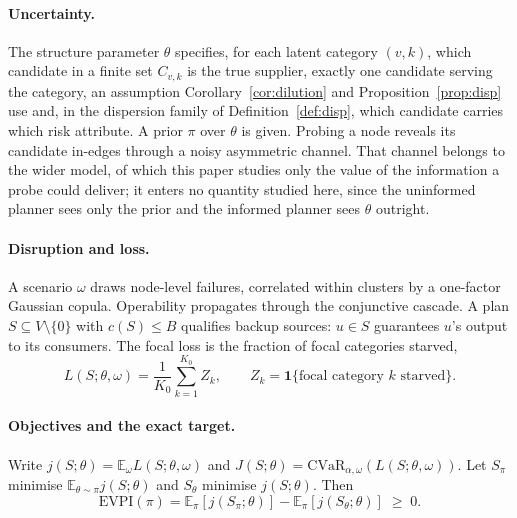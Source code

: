 \documentclass[pdflatex,sn-mathphys-num]{sn-jnl}
\theoremstyle{thmstyleone}
\theoremstyle{thmstyletwo}
\theoremstyle{thmstylethree}
\newcommand{\evpi}{\mathrm{EVPI}}
\newcommand{\cvar}{\mathrm{CVaR}}
\begin{document}
\paragraph{Uncertainty.} The structure parameter $\theta$ specifies, for
each latent category $(v,k)$, which candidate in a finite set $C_{v,k}$ is
the true supplier, exactly one candidate serving the category, an assumption
Corollary~\ref{cor:dilution} and Proposition~\ref{prop:disp} use and, in the
dispersion family of Definition~\ref{def:disp}, which candidate carries which
risk attribute. A
prior $\pi$ over $\theta$ is given. Probing a node reveals its candidate
in-edges through a noisy asymmetric channel. That channel belongs to the
wider model, of which this paper studies only the value of the information a
probe could deliver; it enters no quantity studied here, since the
uninformed planner sees only the prior and the informed planner sees
$\theta$ outright.

\paragraph{Disruption and loss.} A scenario $\omega$ draws node-level
failures, correlated within clusters by a one-factor Gaussian copula.
Operability propagates through the conjunctive cascade. A plan
$S\subseteq V\setminus\{0\}$ with $c(S)\le B$ qualifies backup sources:
$u\in S$ guarantees $u$'s output to its consumers. The focal loss is the
fraction of focal categories starved,
\begin{equation}
L(S;\theta,\omega)=\frac{1}{K_0}\sum_{k=1}^{K_0} Z_k,
\qquad Z_k=\mathbf{1}\{\text{focal category }k\text{ starved}\}.
\label{eq:loss}
\end{equation}

\paragraph{Objectives and the exact target.} Write
$j(S;\theta)=\mathbb{E}_\omega L(S;\theta,\omega)$ and
$J(S;\theta)=\cvar_{\alpha,\omega}(L(S;\theta,\omega))$. Let $S_\pi$
minimise $\mathbb{E}_{\theta\sim\pi}j(S;\theta)$ and $S_\theta$ minimise
$j(S;\theta)$. Then
\begin{equation}
\evpi(\pi)=\mathbb{E}_\pi\!\left[j(S_\pi;\theta)\right]
-\mathbb{E}_\pi\!\left[j(S_\theta;\theta)\right]\;\ge\;0 .
\label{eq:evpi}
\end{equation}
\end{document}
